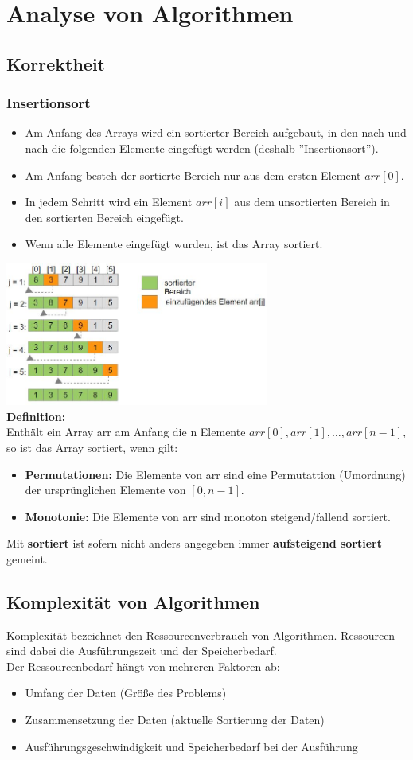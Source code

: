 \documentclass{scrreprt}
\begin{document}
\chapter{Analyse von Algorithmen}
\section{Korrektheit}
\subsection{Insertionsort}
\begin{itemize}
  \item Am Anfang des Arrays wird ein sortierter Bereich aufgebaut, in den nach und nach die folgenden Elemente 
  eingefügt werden (deshalb ''Insertionsort'').
  \item Am Anfang besteh der sortierte Bereich nur aus dem ersten Element $arr[0]$.
  \item In jedem Schritt wird ein Element $arr[i]$ aus dem unsortierten Bereich in den sortierten Bereich eingefügt.
  \item Wenn alle Elemente eingefügt wurden, ist das Array sortiert.
\end{itemize}
\includegraphics[width=0.65\textwidth]{graphics/insertionsort}
\\\textbf{Definition:}
\\ Enthält ein Array arr am Anfang die n Elemente $arr[0],arr[1],\dots,arr[n-1]$, so ist das Array sortiert, wenn gilt:
\begin{itemize}
  \item \textbf{Permutationen:} Die Elemente von arr sind eine Permutattion (Umordnung) der ursprünglichen 
  Elemente von $[0,n-1]$.
  \item \textbf{Monotonie:} Die Elemente von arr sind monoton steigend/fallend sortiert.
\end{itemize}
Mit \textbf{sortiert} ist sofern nicht anders angegeben immer \textbf{aufsteigend sortiert} gemeint.
\section{Komplexität von Algorithmen}
Komplexität bezeichnet den Ressourcenverbrauch von Algorithmen. Ressourcen sind dabei die Ausführungszeit und der Speicherbedarf.
\\Der Ressourcenbedarf hängt von mehreren Faktoren ab:
\begin{itemize}
  \item Umfang der Daten (Größe des Problems)
  \item Zusammensetzung der Daten (aktuelle Sortierung der Daten)
  \item Ausführungsgeschwindigkeit und Speicherbedarf bei der Ausführung
\end{itemize}
\end{document}
